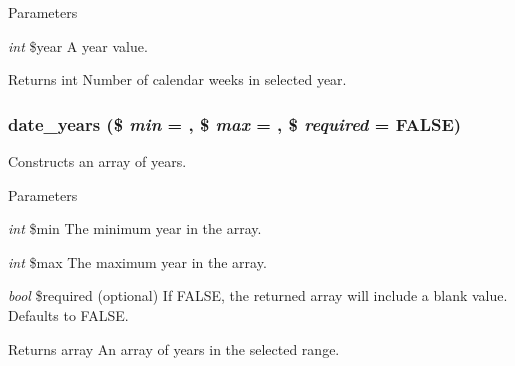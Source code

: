 \begin{DoxyParams}{Parameters}
\item[{\em int}]\$year A year value.\end{DoxyParams}
\begin{DoxyReturn}{Returns}
int Number of calendar weeks in selected year. 
\end{DoxyReturn}
\hypertarget{date__api_8module_a658020fa9056e86b43cef0d3679c8597}{
\subsubsection[{date\_\-years}]{\setlength{\rightskip}{0pt plus 5cm}date\_\-years (\$ {\em min} = {}, \/  \$ {\em max} = {}, \/  \$ {\em required} = {\ttfamily FALSE})}}
\label{date__api_8module_a658020fa9056e86b43cef0d3679c8597}
Constructs an array of years.


\begin{DoxyParams}{Parameters}
\item[{\em int}]\$min The minimum year in the array. \item[{\em int}]\$max The maximum year in the array. \item[{\em bool}]\$required (optional) If FALSE, the returned array will include a blank value. Defaults to FALSE.\end{DoxyParams}
\begin{DoxyReturn}{Returns}
array An array of years in the selected range. 
\end{DoxyReturn}

